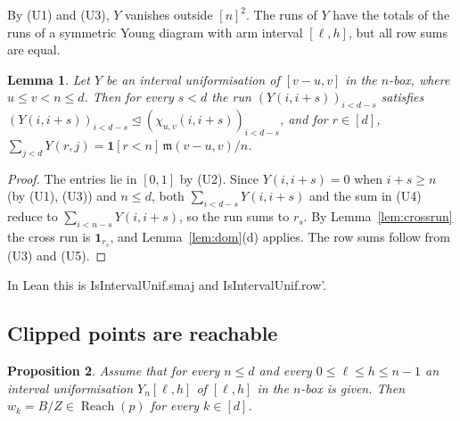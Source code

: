 \documentclass[11pt]{amsart}
\newtheorem{lemma}{Lemma}[section]
\newtheorem{proposition}[lemma]{Proposition}
\theoremstyle{definition}
\theoremstyle{remark}
\numberwithin{equation}{section}
\newcommand{\Reach}{\operatorname{Reach}}
\newcommand{\ind}[1]{\mathbf{1}[#1]}
\newcommand{\dom}{\trianglelefteq}
\newcommand{\ms}{\mathfrak{m}}
\newcommand{\leanus}{\textunderscore\allowbreak}
\newcommand{\lean}[1]{{\ttfamily\let\_\leanus #1}}
\begin{document}
By (U1) and (U3), $Y$ vanishes outside $[n]^2$. The runs of $Y$ have the totals of the runs of a
symmetric Young diagram with arm interval $[\ell,h]$, but all row sums are equal.

\begin{lemma}\label{lem:unifdom}
Let $Y$ be an interval uniformisation of $[v-u,v]$ in the $n$-box, where $u\le v<n\le d$. Then for every
$s<d$ the run $(Y(i,i+s))_{i<d-s}$ satisfies $(Y(i,i+s))_{i<d-s}\dom(\chi_{u,v}(i,i+s))_{i<d-s}$, and
for $r\in[d]$, $\sum_{j<d}Y(r,j)=\ind{r<n}\,\ms(v-u,v)/n$.
\end{lemma}

\begin{proof}
The entries lie in $[0,1]$ by (U2). Since $Y(i,i+s)=0$ when $i+s\ge n$ (by (U1), (U3)) and $n\le d$,
both $\sum_{i<d-s}Y(i,i+s)$ and the sum in (U4) reduce to $\sum_{i<n-s}Y(i,i+s)$, so the run sums to
$r_s$. By Lemma~\ref{lem:crossrun} the cross run is $\mathbf 1_{r_s}$, and Lemma~\ref{lem:dom}(d)
applies. The row sums follow from (U3) and (U5).
\end{proof}

In Lean this is \lean{IsIntervalUnif.smaj} and \lean{IsIntervalUnif.row'}.

\subsection{Clipped points are reachable}

\begin{proposition}\label{prop:wk}
Assume that for every $n\le d$ and every $0\le\ell\le h\le n-1$ an interval uniformisation
$Y_n[\ell,h]$ of $[\ell,h]$ in the $n$-box is given. Then $w_k=B/Z\in\Reach(p)$ for every $k\in[d]$.
\end{proposition}
\end{document}
